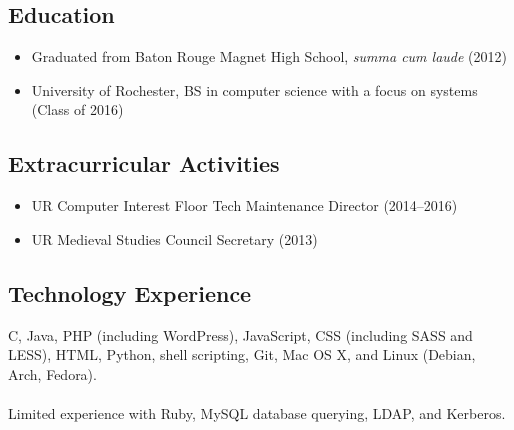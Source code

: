 \documentclass[10pt]{article}
\begin{document}
\subsection*{Education}

\begin{itemize}
	\item Graduated from Baton Rouge Magnet High School, \textit{summa cum laude} (2012)
	\item University of Rochester, BS in computer science with a focus on systems (Class of 2016)
\end{itemize}



\subsection*{Extracurricular Activities}

\begin{itemize}
	\item UR Computer Interest Floor Tech Maintenance Director (2014--2016)
	\item UR Medieval Studies Council Secretary (2013)
\end{itemize}



\subsection*{Technology Experience}

C, Java, PHP (including WordPress), JavaScript, CSS (including SASS and LESS), HTML, Python, shell scripting, Git, Mac OS X, and Linux (Debian, Arch, Fedora).\\
\leavevmode\\
Limited experience with Ruby, MySQL database querying, LDAP, and Kerberos.
\end{document}

